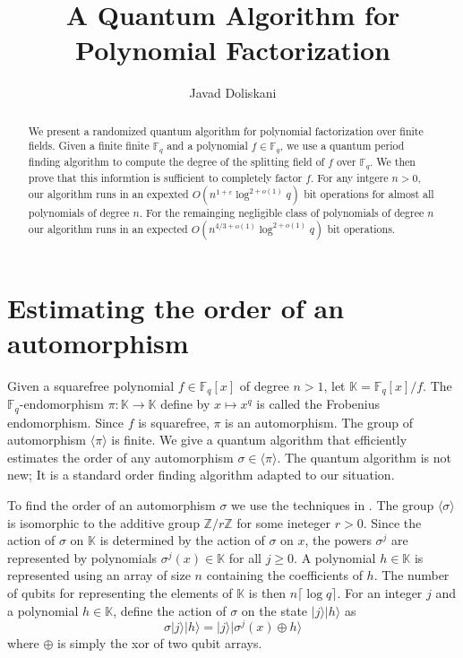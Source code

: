 \documentclass{article}
\title{A Quantum Algorithm for Polynomial Factorization}
\author[1]{Javad Doliskani}
\affil[1]{\small Institute for Quantum Computing, University of Waterloo}
\date{}
\theoremstyle{plain}
\theoremstyle{definition}
\newcommand{\lrang}[1]{\langle#1\rangle}
\newcommand{\ldbrac}[1]{\lvert#1\rangle}
\def\K{\ensuremath{\mathbb{K}}}
\def\Z{\ensuremath{\mathbb{Z}}}
\def\F{\ensuremath{\mathbb{F}}}
\begin{document}
\maketitle

\begin{abstract}
We present a randomized quantum algorithm for polynomial factorization over finite fields. 
Given a finite finite $\mathbb{F}_q$ and a polynomial $f \in \mathbb{F}_q$, we use a quantum 
period finding algorithm to compute the degree of the splitting field of $f$ over 
$\mathbb{F}_q$. We then prove that this informtion is sufficient to completely factor $f$. For 
any intgere $n > 0$, our algorithm runs in an expexted $O(n^{1 + \varepsilon} \log^{2 + o(1)}q)$ bit 
operations for almost all polynomials of degree $n$. For the remainging negligible class of 
polynomials of degree $n$ our algorithm runs in an expected $O(n^{4 / 3 + o(1)} \log^{2 + 
o(1)}q)$ bit operations.
\end{abstract}




\section{Estimating the order of an automorphism}
\label{sec:ord-frob}

Given a squarefree polynomial $f \in \F_q[x]$ of degree $n > 1$, let $\K = \F_q[x] / f$. The 
$\F_q$-endomorphism $\pi: \K \rightarrow \K$ define by $x \mapsto x^q$ is called the Frobenius 
endomorphism. Since $f$ is squarefree, $\pi$ is an automorphism. The group of automorphism 
$\lrang{\pi}$ is finite. We give a quantum algorithm that efficiently estimates the order of any 
automorphism $\sigma \in \lrang{\pi}$. The quantum algorithm is not new; It is a standard order 
finding algorithm adapted to our situation. 

To find the order of an automorphism $\sigma$ we use the techniques in \cite{kaye2007introduction, 
nielsen2010quantum}. The group $\lrang{\sigma}$ is isomorphic to the additive group $\Z/r\Z$ for 
some ineteger $r > 0$. Since the action of $\sigma$ on $\K$ is determined by the action of $\sigma$ 
on $x$, the powers $\sigma^j$ are represented by polynomials $\sigma^j(x) \in \K$ for all $j \ge 0$. 
A polynomial $h \in \K$ is represented using an array of size $n$ containing the coefficients of 
$h$. The number of qubits for representing the elements of $\K$ is then $n\lceil \log q \rceil$. For 
an integer $j$ and a polynomial $h \in \K$, define the action of $\sigma$ on the state $\ldbrac{j} 
\ldbrac{h}$ as
\begin{equation}
	\label{equ:sig-act}
	\sigma \ldbrac{j}\ldbrac{h} = \ldbrac{j}\ldbrac{\sigma^j(x) \oplus h}
\end{equation}
where $\oplus$ is simply the xor of two qubit arrays.
\end{document}
